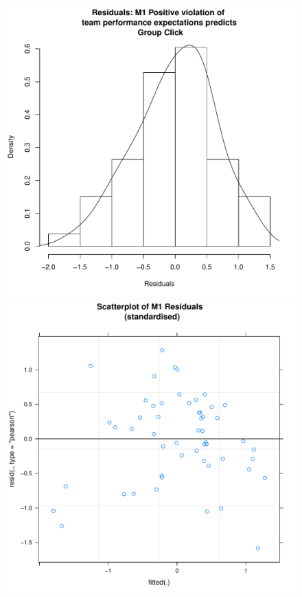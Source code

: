\begin{figure}[htbp]
    \includegraphics[scale =.4]{images/TEM1Hist.pdf}
    \includegraphics[scale =.4]{images/TEM1Scatter.pdf}

\end{figure}
